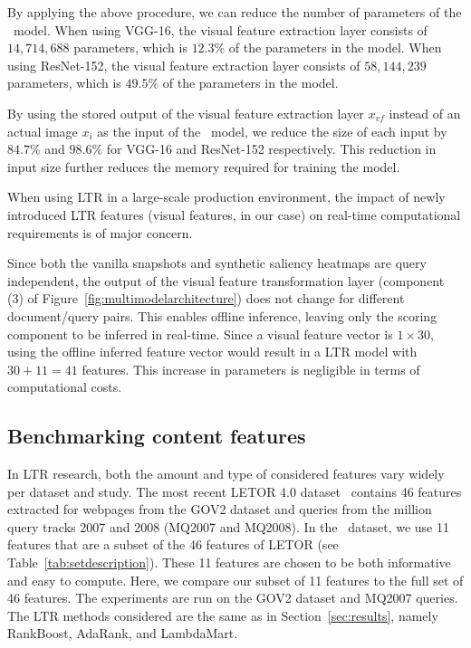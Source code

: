 By applying the above procedure, we can reduce the number of parameters of the \modelname~model.
When using VGG-16, the visual feature extraction layer consists of $14,714,688$ parameters, which is $12.3\%$ of the parameters in the \modelname{} model.
When using ResNet-152, the visual feature extraction layer consists of $58,144,239$ parameters, which is $49.5\%$ of the parameters in the \modelname{} model.

By using the stored output of the visual feature extraction layer $x_{vf}$ instead of an actual image $x_{i}$ as the input of the \modelname~model,
we reduce the size of each input by $84.7\%$ and $98.6\%$ for VGG-16 and ResNet-152 respectively.
This reduction in input size further reduces the memory required for training the model.


When using \ac{LTR} in a large-scale production environment, the impact of newly introduced \ac{LTR} features (visual features, in our case) on real-time computational requirements is of major concern.

Since both the vanilla snapshots and synthetic saliency heat\-maps are query independent, the output of the visual feature transformation layer (component (3) of Figure~\ref{fig:multimodelarchitecture}) does not change for different document/query pairs. This enables offline inference, leaving only the scoring component to be inferred in real-time.
Since a visual feature vector is $1\times30$, using the offline inferred feature vector would result in a \ac{LTR} model with $30 + 11 = 41$ features. This increase in parameters is negligible in terms of computational costs.


\subsection{Benchmarking content features} \label{sec:contentfeatures}
In \ac{LTR} research, both the amount and type of considered features vary widely per dataset and study.
The most recent LETOR 4.0 dataset~\cite{Qin2013:Introducing} contains 46 features extracted for webpages from the GOV2 dataset and queries from the million query tracks 2007 and 2008 (MQ2007 and MQ2008).
In the \datasetname~dataset, we use 11 features that are a subset of the 46 features of LETOR (see Table~\ref{tab:setdescription}).
These 11 features are chosen to be both informative and easy to compute.
Here, we compare our subset of 11 features to the full set of 46 features.
The experiments are run on the GOV2 dataset and MQ2007 queries.
The \ac{LTR} methods considered are the same as in Section~\ref{sec:results}, namely RankBoost, AdaRank, and LambdaMart.

